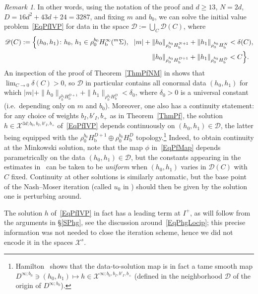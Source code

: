 \documentclass[reqno,11pt,letterpaper]{amsart}
\numberwithin{equation}{section}
\numberwithin{figure}{section}
\theoremstyle{definition}
\theoremstyle{remark}
\newtheorem{rmk}[thm]{Remark}
\newcommand{\mc}{\mathcal}
\newcommand{\cX}{\mc X}
\newcommand{\ms}{\mathscr}
\newcommand{\sD}{\ms D}
\newcommand{\bop}{{\mathrm{b}}}
\newcommand{\Hb}{H_{\bop}}
\begin{document}
\begin{rmk}
\label{RmkPfCts}
  In other words, using the notation of the proof and $d\geq 13$, $N=2 d$, $D=16 d^2+43 d+24=3287$, and fixing $m$ and $b_0$, we can solve the initial value problem~\eqref{EqPfIVP} for data in the space $\sD:=\bigcup_C \sD(C)$, where
  \begin{align*}
    \sD(C):=\Bigl\{(h_0,h_1) \colon h_0,\,h_1\in\rho_0^{b_0}\Hb^\infty({}^m\Sigma),\ \ 
      |m|+{}&\|h_0\|_{\rho_0^{b_0}\Hb^{N+1}}+\|h_1\|_{\rho_0^{b_0}\Hb^N} <\delta(C), \\
      &\|h_0\|_{\rho_0^{b_0}\Hb^{D+1}}+\|h_1\|_{\rho_0^{b_0}\Hb^D}<C \Bigr\}.
  \end{align*}
  An inspection of the proof of Theorem~\ref{ThmPfNM} in \cite{SaintRaymondNashMoser} shows that $\lim_{C\to 0}\delta(C)>0$, so $\sD$ in particular contains all conormal data $(h_0,h_1)$ for which $|m|+\|h_0\|_{\rho_0^{b_0}\Hb^{D+1}}+\|h_1\|_{\rho_0^{b_0}\Hb^D}<\delta_0$, where $\delta_0>0$ is a universal constant (i.e.\ depending only on $m$ and $b_0$). Moreover, one also has a continuity statement: for any choice of weights $b_I,b'_I,b_+$ as in Theorem~\ref{ThmPf}, the solution $h\in\cX^{3 d;b_0,b_I,b'_I,b_+}$ of~\eqref{EqPfIVP} depends continuously on $(h_0,h_1)\in\sD$, the latter being equipped with the $\rho_0^{b_0}\Hb^{D+1}\oplus\rho_0^{b_0}\Hb^D$ topology.\footnote{Hamilton~\cite{HamiltonNashMoser} shows that the data-to-solution map is in fact a tame smooth map $D^{\infty;b_0}\ni(h_0,h_1)\mapsto h\in\cX^{\infty;b_0,b_I,b'_I,b_+}$ (defined in the neighborhood $\sD$ of the origin of $D^{\infty;b_0}$).} Indeed, to obtain continuity at the Minkowski solution, note that the map $\phi$ in~\eqref{EqPfMap} depends parametrically on the data $(h_0,h_1)\in\sD$, but the constants appearing in the estimates in~\cite{SaintRaymondNashMoser} can be taken to be \emph{uniform} when $(h_0,h_1)$ varies in $\sD(C)$ with $C$ fixed. Continuity at other solutions is similarly automatic, but the base point of the Nash--Moser iteration (called $u_0$ in \cite[Lemma~1]{SaintRaymondNashMoser}) should then be given by the solution one is perturbing around.
\end{rmk}

The solution $h$ of~\eqref{EqPfIVP} in fact has a leading term at $I^+$, as will follow from the arguments in \S\ref{SPhg}, see the discussion around~\eqref{EqPhgLocip}; this precise information was not needed to close the iteration scheme, hence we did not encode it in the spaces $\cX^s$.
\end{document}
